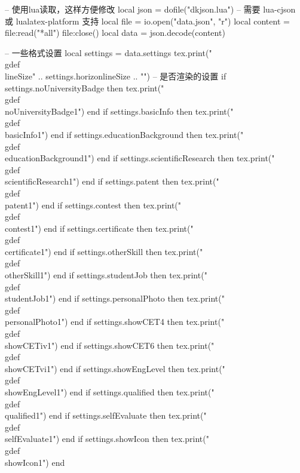 \documentclass[10pt, a4paper, oneside]{ctexart}
\begin{document}
\setlength{\parindent}{0pt}

\begin{luacode}
-- 使用lua读取，这样方便修改
local json = dofile("dkjson.lua")  -- 需要 lua-cjson 或 lualatex-platform 支持
local file = io.open("data.json", "r")
local content = file:read("*all")
file:close()
local data = json.decode(content)

-- 一些格式设置
local settings = data.settings
tex.print("\\gdef\\lineSize{" .. settings.horizonlineSize .. "}")
-- 是否渲染的设置
if settings.noUniversityBadge then
    tex.print("\\gdef\\noUniversityBadge{1}")
end
if settings.basicInfo then
    tex.print("\\gdef\\basicInfo{1}")
end
if settings.educationBackground then
    tex.print("\\gdef\\educationBackground{1}")
end
if settings.scientificResearch then
    tex.print("\\gdef\\scientificResearch{1}")
end
if settings.patent then
    tex.print("\\gdef\\patent{1}")
end
if settings.contest then
    tex.print("\\gdef\\contest{1}")
end
if settings.certificate then
    tex.print("\\gdef\\certificate{1}")
end
if settings.otherSkill then
    tex.print("\\gdef\\otherSkill{1}")
end
if settings.studentJob then
    tex.print("\\gdef\\studentJob{1}")
end
if settings.personalPhoto then
    tex.print("\\gdef\\personalPhoto{1}")
end
if settings.showCET4 then
    tex.print("\\gdef\\showCETiv{1}")
end
if settings.showCET6 then
    tex.print("\\gdef\\showCETvi{1}")
end
if settings.showEngLevel then
    tex.print("\\gdef\\showEngLevel{1}")
end
if settings.qualified then
    tex.print("\\gdef\\qualified{1}")
end
if settings.selfEvaluate then
    tex.print("\\gdef\\selfEvaluate{1}")
end
if settings.showIcon then
    tex.print("\\gdef\\showIcon{1}")
end



\end{luacode}
\end{document}
